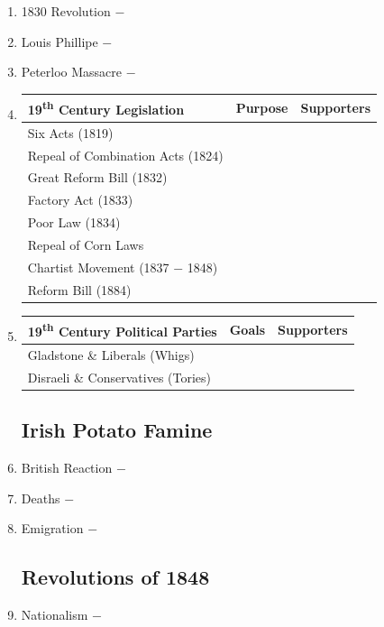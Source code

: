 \documentclass[12pt]{article}
\begin{document}
\begin{enumerate}
\item 1830 Revolution $-$ 

\item Louis Phillipe $-$

\item Peterloo Massacre $-$ 

\item \begin{tabular}{l c c}

19\textsuperscript{th} Century Legislation & Purpose & Supporters \\
\hline
Six Acts (1819) & & \\
\hline
Repeal of Combination Acts (1824) & & \\
\hline
Great Reform Bill (1832) & & \\
\hline
Factory Act (1833) & & \\
\hline
Poor Law (1834) & & \\
\hline
Repeal of Corn Laws & & \\
\hline
Chartist Movement (1837 $-$ 1848) & & \\
\hline 
Reform Bill (1884) & & \\
\end{tabular}

\item \begin{tabular}{l c c}
\hline
19\textsuperscript{th} Century Political Parties & Goals & Supporters \\
\hline
Gladstone \& Liberals (Whigs) & & \\
\hline
Disraeli \& Conservatives (Tories) & & \\
\hline
\end{tabular}

\subsection{Irish Potato Famine}
\item British Reaction $-$ 

\item Deaths $-$ 

\item Emigration $-$

\subsection{Revolutions of 1848}

\item Nationalism $-$ 


\end{enumerate}
\end{document}
